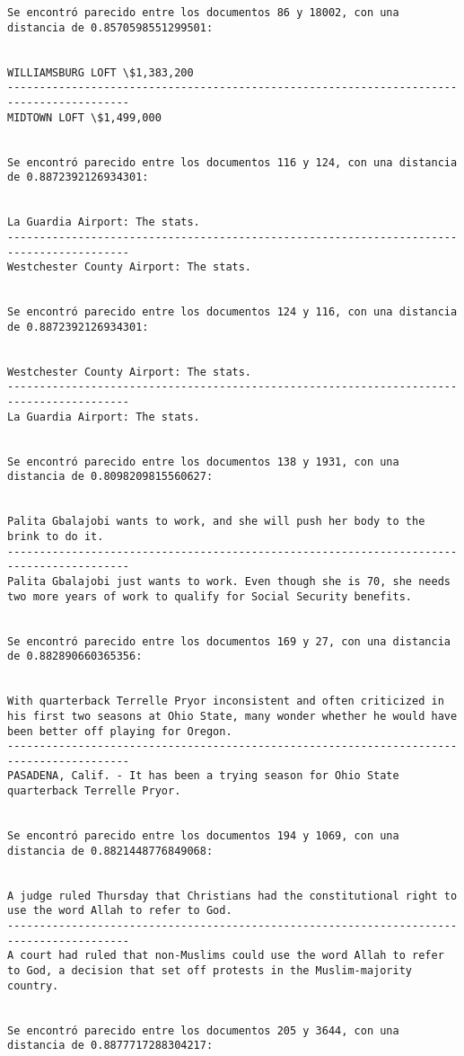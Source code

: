 \documentclass[11pt]{article}
\begin{document}
\begin{Verbatim}[commandchars=\\\{\}]
Se encontró parecido entre los documentos 86 y 18002, con una distancia de 0.8570598551299501:


WILLIAMSBURG LOFT \$1,383,200
-----------------------------------------------------------------------------------------
MIDTOWN LOFT \$1,499,000


Se encontró parecido entre los documentos 116 y 124, con una distancia de 0.8872392126934301:


La Guardia Airport: The stats.
-----------------------------------------------------------------------------------------
Westchester County Airport: The stats.


Se encontró parecido entre los documentos 124 y 116, con una distancia de 0.8872392126934301:


Westchester County Airport: The stats.
-----------------------------------------------------------------------------------------
La Guardia Airport: The stats.


Se encontró parecido entre los documentos 138 y 1931, con una distancia de 0.8098209815560627:


Palita Gbalajobi wants to work, and she will push her body to the brink to do it.
-----------------------------------------------------------------------------------------
Palita Gbalajobi just wants to work. Even though she is 70, she needs two more years of work to qualify for Social Security benefits.


Se encontró parecido entre los documentos 169 y 27, con una distancia de 0.882890660365356:


With quarterback Terrelle Pryor inconsistent and often criticized in his first two seasons at Ohio State, many wonder whether he would have been better off playing for Oregon.
-----------------------------------------------------------------------------------------
PASADENA, Calif. - It has been a trying season for Ohio State quarterback Terrelle Pryor.


Se encontró parecido entre los documentos 194 y 1069, con una distancia de 0.8821448776849068:


A judge ruled Thursday that Christians had the constitutional right to use the word Allah to refer to God.
-----------------------------------------------------------------------------------------
A court had ruled that non-Muslims could use the word Allah to refer to God, a decision that set off protests in the Muslim-majority country.


Se encontró parecido entre los documentos 205 y 3644, con una distancia de 0.8877717288304217:



\end{Verbatim}
\end{document}

